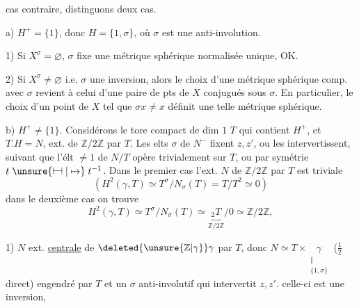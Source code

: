
cas contraire, distinguons deux cas.

a) $H^+=\{1\}$, donc $H=\{1,\sigma\}$, où $\sigma$ est une anti-involution.

1) Si \deleted{$\unsure{\sigma}$} $X^\sigma=\varnothing$, $\sigma$ fixe une métrique sphérique normalisée unique, OK.

2) Si $X^\sigma\ne\varnothing$ i.e. $\sigma$ une inversion, alors le choix d'une métrique sphérique comp. avec $\sigma$ revient à celui d'une paire de pts de $X$ conjugués sous $\sigma$. En particulier, le choix d'un point  de $X$ tel que $\sigma x\ne x$ définit une telle métrique sphérique.

b) $H^+\ne\{1\}$. Considérons le  tore  compact de dim $1$ $T$ qui contient $H^+$, et $T.H=N$, ext. de  $\mathbb Z/2\mathbb Z$ par $T$. Les elts  $\sigma$ de $N^-$ fixent $z,z'$, ou les intervertissent, suivant que l'élt $\ne1$ de $N/T$ opère trivialement sur $T$, ou par symétrie $t\mathrel{\unsure{\vdash\!\dashv|\mapsto}}t^{-1}$.
Dans le premier cas l'ext. $N$ de \inserted{$\gamma=$}$\mathbb Z/2\mathbb Z$ par $T$ est triviale
\[
(H^2(\gamma,T)\simeq T^\sigma/N_\sigma(T)=T/T^2\simeq0)
\]
dans le deuxième cas on trouve
\[
H^2(\gamma,T)\simeq T^\sigma/N_\sigma(T)\simeq \underbrace{{}_2T}_{\mathbb Z/2\mathbb Z}/0\simeq\mathbb Z/2\mathbb Z,
\]

1) $N$ ext. \uline{centrale} de $\deleted{\unsure{\mathbb Z|\gamma}}\gamma$ par $T$, donc $N\simeq T\times\underset{\substack{\Vert\\\{1,\sigma\}}}{\gamma}$ ($\frac12$ direct) engendré par $T$ et un $\sigma$  anti-involutif qui  intervertit $z,z'$.   celle-ci est une inversion, 


